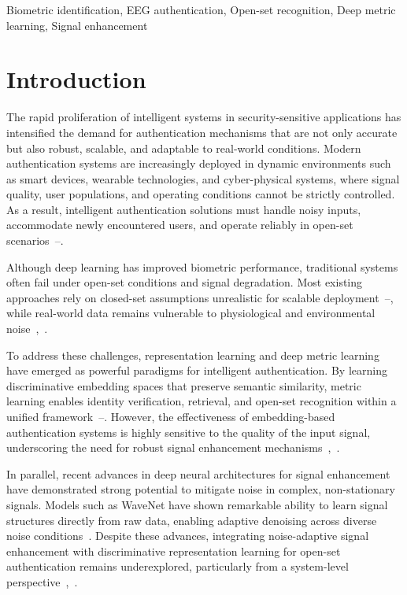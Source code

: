 \documentclass[conference]{IEEEtran}
\begin{document}
\begin{IEEEkeywords}
Biometric identification, EEG authentication, Open-set recognition, Deep metric learning, Signal enhancement
\end{IEEEkeywords}

\section{Introduction}

The rapid proliferation of intelligent systems in security-sensitive applications has intensified the demand for authentication mechanisms that are not only accurate but also robust, scalable, and adaptable to real-world conditions. Modern authentication systems are increasingly deployed in dynamic environments such as smart devices, wearable technologies, and cyber-physical systems, where signal quality, user populations, and operating conditions cannot be strictly controlled. As a result, intelligent authentication solutions must handle noisy inputs, accommodate newly encountered users, and operate reliably in open-set scenarios~\cite{b1}--\cite{b3}.

Although deep learning has improved biometric performance, traditional systems often fail under open-set conditions and signal degradation. Most existing approaches rely on closed-set assumptions unrealistic for scalable deployment~\cite{b1}--\cite{b3}, while real-world data remains vulnerable to physiological and environmental noise~\cite{b1},~\cite{b4}.

To address these challenges, representation learning and deep metric learning have emerged as powerful paradigms for intelligent authentication. By learning discriminative embedding spaces that preserve semantic similarity, metric learning enables identity verification, retrieval, and open-set recognition within a unified framework~\cite{b5}--\cite{b8}. However, the effectiveness of embedding-based authentication systems is highly sensitive to the quality of the input signal, underscoring the need for robust signal enhancement mechanisms~\cite{b1},~\cite{b4}.

In parallel, recent advances in deep neural architectures for signal enhancement have demonstrated strong potential to mitigate noise in complex, non-stationary signals. Models such as WaveNet have shown remarkable ability to learn signal structures directly from raw data, enabling adaptive denoising across diverse noise conditions~\cite{b14}. Despite these advances, integrating noise-adaptive signal enhancement with discriminative representation learning for open-set authentication remains underexplored, particularly from a system-level perspective~\cite{b1},~\cite{b2}.
\end{document}
